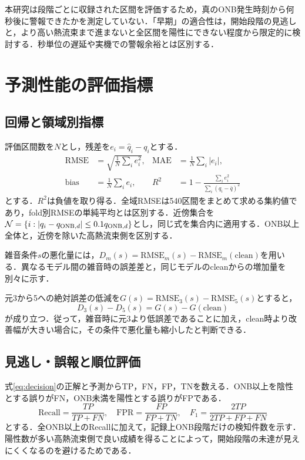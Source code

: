 本研究は段階ごとに収録された区間を評価するため，真のONB発生時刻から何秒後に警報できたかを測定していない．「早期」の適合性は，開始段階の見逃しと，より高い熱流束まで進まないと全区間を陽性にできない程度から限定的に検討する．秒単位の遅延や実機での警報余裕とは区別する．

\section{予測性能の評価指標}
\subsection{回帰と領域別指標}
評価区間数を$N$とし，残差を$e_i=\hat q_i-q_i$とする．
\begin{align}
 \mathrm{RMSE}&=\sqrt{\frac{1}{N}\sum_i e_i^2},&
 \mathrm{MAE}&=\frac{1}{N}\sum_i|e_i|,\\
 \mathrm{bias}&=\frac{1}{N}\sum_i e_i,&
 R^2&=1-\frac{\sum_i e_i^2}{\sum_i(q_i-\bar q)^2}
\end{align}
とする．$R^2$は負値を取り得る．全域RMSEは540区間をまとめて求める集約値であり，fold別RMSEの単純平均とは区別する．近傍集合を$\mathcal N=\{i:|q_i-q_{\mathrm{ONB},d}|\le0.1q_{\mathrm{ONB},d}\}$とし，同じ式を集合内に適用する．ONB以上全体と，近傍を除いた高熱流束側を区別する．

雑音条件$s$の悪化量には，$D_m(s)=\mathrm{RMSE}_m(s)-\mathrm{RMSE}_m(\mathrm{clean})$を用いる．異なるモデル間の雑音時の誤差差と，同じモデルのcleanからの増加量を別々に示す．

元3から5への絶対誤差の低減を$G(s)=\mathrm{RMSE}_3(s)-\mathrm{RMSE}_5(s)$とすると，
\begin{equation}\label{eq:gap_degradation}
 D_3(s)-D_5(s)=G(s)-G(\mathrm{clean})
\end{equation}
が成り立つ．従って，雑音時に元3より低誤差であることに加え，clean時より改善幅が大きい場合に，その条件で悪化量も縮小したと判断できる．

\subsection{見逃し・誤報と順位評価}
式\eqref{eq:decision}の正解と予測からTP，FN，FP，TNを数える．ONB以上を陰性とする誤りがFN，ONB未満を陽性とする誤りがFPである．
\begin{equation}
 \mathrm{Recall}=\frac{TP}{TP+FN},\quad
 \mathrm{FPR}=\frac{FP}{FP+TN},\quad
 F_1=\frac{2TP}{2TP+FP+FN}
\end{equation}
とする．全ONB以上のRecallに加えて，記録上ONB段階だけの検知件数を示す．陽性数が多い高熱流束側で良い成績を得ることによって，開始段階の未達が見えにくくなるのを避けるためである．


